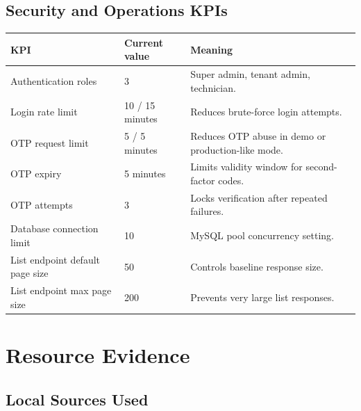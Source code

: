 \documentclass[12pt,a4paper]{report}
\begin{document}
\section{Security and Operations KPIs}

\begin{tabularx}{\linewidth}{p{4.4cm}p{3.3cm}Y}
\toprule
KPI & Current value & Meaning \\
\midrule
Authentication roles & 3 & Super admin, tenant admin, technician. \\
Login rate limit & 10 / 15 minutes & Reduces brute-force login attempts. \\
OTP request limit & 5 / 5 minutes & Reduces OTP abuse in demo or production-like mode. \\
OTP expiry & 5 minutes & Limits validity window for second-factor codes. \\
OTP attempts & 3 & Locks verification after repeated failures. \\
Database connection limit & 10 & MySQL pool concurrency setting. \\
List endpoint default page size & 50 & Controls baseline response size. \\
List endpoint max page size & 200 & Prevents very large list responses. \\
\bottomrule
\end{tabularx}

\chapter{Resource Evidence}

\section{Local Sources Used}
\end{document}
